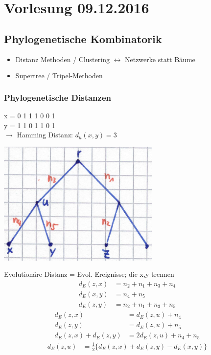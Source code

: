 \section{Vorlesung 09.12.2016}
\subsection{Phylogenetische Kombinatorik}
		
\begin{itemize}
	\item Distanz Methoden / Clustering $\leftrightarrow$ Netzwerke statt Bäume 
	\item Supertree / Tripel-Methoden
\end{itemize}
\subsubsection{Phylogenetische Distanzen}

x = \color{red}0 \color{green}1 \color{red}1 \color{green}1 \color{red}0 \color{green}0 1\\\color{black}
y = \color{red}1 \color{green}1 \color{red}0 \color{green}1 \color{red}1 \color{green}0 1\\
\color{black}$\rightarrow$ Hamming Distanz: $d_h(x,y) = 3$

\begin{center}
	\includegraphics[scale=0.7]{lectures/161209/pix/evol_distanz}
\end{center}

Evolutionäre Distanz = Evol. Ereignisse; die x,y trennen	
\begin{align*}
	d_E (z,x) &= n_2 + n_1 + n_3 + n_4\\
	d_E (x,y) &= n_4 + n_5\\
	d_E (z,y) &= n_2 + n_1 + n_3 + n_5
\end{align*}
\begin{align*}
	d_E (z,x) &= d_E (z,u) + n_4\\
	d_E (z,y) &= d_E (z,u) + n_5\\
	d_E (z,x) + d_E (z,y) &= 2 d_E(z,u) + n_4 + n_5
\end{align*}
\begin{align*}
	d_E (z,u) &= \frac{1}{2} \lbrace d_E (z,x) + d_E (z,y) - d_E (x,y) \rbrace
\end{align*}

